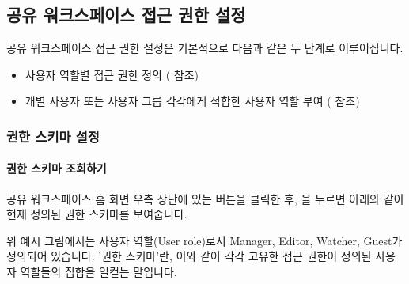 \documentclass[letterpaper,10pt,english]{sphinxmanual}
\begin{document}
\subsection{공유 워크스페이스 접근 권한 설정}
\label{\detokenize{discovery/part03/shared_workspace:shared-workspace-permission}}\label{\detokenize{discovery/part03/shared_workspace:id4}}
공유 워크스페이스 접근 권한 설정은 기본적으로 다음과 같은 두 단계로 이루어집니다.
\begin{itemize}
\item {} 
사용자 역할별 접근 권한 정의 ({\hyperref[\detokenize{discovery/part03/shared_workspace:permission-schema-setup}]{}} 참조)

\item {} 
개별 사용자 또는 사용자 그룹 각각에게 적합한 사용자 역할 부여 ({\hyperref[\detokenize{discovery/part03/shared_workspace:shared-members-setup}]{}} 참조)

\end{itemize}


\subsubsection{권한 스키마 설정}
\label{\detokenize{discovery/part03/shared_workspace:permission-schema-setup}}\label{\detokenize{discovery/part03/shared_workspace:id5}}

\paragraph{권한 스키마 조회하기}
\label{\detokenize{discovery/part03/shared_workspace:permission-schema-view}}\label{\detokenize{discovery/part03/shared_workspace:id6}}
공유 워크스페이스 홈 화면 우측 상단에 있는  버튼을 클릭한 후, 을 누르면 아래와 같이 현재 정의된 권한 스키마를 보여줍니다.
\begin{quote}

\begin{figure}[H]
\centering

\noindent{}
\end{figure}
\end{quote}

위 예시 그림에서는 사용자 역할(User role)로서 Manager, Editor, Watcher, Guest가 정의되어 있습니다. '권한 스키마'란, 이와 같이 각각 고유한 접근 권한이 정의된 사용자 역할들의 집합을 일컫는 말입니다.
\end{document}
